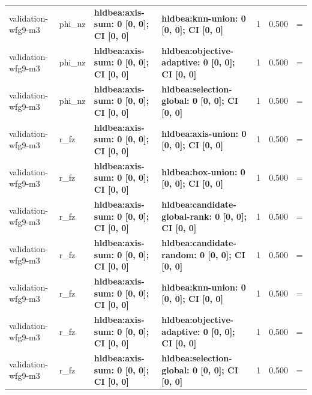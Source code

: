 \begin{tabular}{llllrrc}
validation-wfg9-m3 & phi\_nz & \textbf{hldbea:axis-sum: 0 [0, 0]; CI [0, 0]} & \textbf{hldbea:knn-union: 0 [0, 0]; CI [0, 0]} & 1 & 0.500 & = \\
validation-wfg9-m3 & phi\_nz & \textbf{hldbea:axis-sum: 0 [0, 0]; CI [0, 0]} & \textbf{hldbea:objective-adaptive: 0 [0, 0]; CI [0, 0]} & 1 & 0.500 & = \\
validation-wfg9-m3 & phi\_nz & \textbf{hldbea:axis-sum: 0 [0, 0]; CI [0, 0]} & \textbf{hldbea:selection-global: 0 [0, 0]; CI [0, 0]} & 1 & 0.500 & = \\
validation-wfg9-m3 & r\_fz & \textbf{hldbea:axis-sum: 0 [0, 0]; CI [0, 0]} & \textbf{hldbea:axis-union: 0 [0, 0]; CI [0, 0]} & 1 & 0.500 & = \\
validation-wfg9-m3 & r\_fz & \textbf{hldbea:axis-sum: 0 [0, 0]; CI [0, 0]} & \textbf{hldbea:box-union: 0 [0, 0]; CI [0, 0]} & 1 & 0.500 & = \\
validation-wfg9-m3 & r\_fz & \textbf{hldbea:axis-sum: 0 [0, 0]; CI [0, 0]} & \textbf{hldbea:candidate-global-rank: 0 [0, 0]; CI [0, 0]} & 1 & 0.500 & = \\
validation-wfg9-m3 & r\_fz & \textbf{hldbea:axis-sum: 0 [0, 0]; CI [0, 0]} & \textbf{hldbea:candidate-random: 0 [0, 0]; CI [0, 0]} & 1 & 0.500 & = \\
validation-wfg9-m3 & r\_fz & \textbf{hldbea:axis-sum: 0 [0, 0]; CI [0, 0]} & \textbf{hldbea:knn-union: 0 [0, 0]; CI [0, 0]} & 1 & 0.500 & = \\
validation-wfg9-m3 & r\_fz & \textbf{hldbea:axis-sum: 0 [0, 0]; CI [0, 0]} & \textbf{hldbea:objective-adaptive: 0 [0, 0]; CI [0, 0]} & 1 & 0.500 & = \\
validation-wfg9-m3 & r\_fz & \textbf{hldbea:axis-sum: 0 [0, 0]; CI [0, 0]} & \textbf{hldbea:selection-global: 0 [0, 0]; CI [0, 0]} & 1 & 0.500 & = \\
\bottomrule
\end{tabular}
